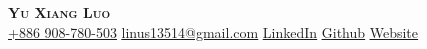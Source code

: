 \begin{center}
    \textbf{\Huge \scshape Yu Xiang Luo} \\ \vspace{1pt}
	\href{tel:+886 908-780-503}{ \underline{+886 908-780-503}} \quad
    \href{mailto:linus13514@gmail.com}{ \underline{linus13514@gmail.com}} \quad
    \href{https://www.linkedin.com/in/yu-xiang-luo-116793269/}{ \underline{LinkedIn}} \quad
    \href{https://github.com/YuXiangLo}{ \underline{Github}} \quad
	\href{https://yuxianglo.github.io}{ \underline{Website}}
\end{center}
